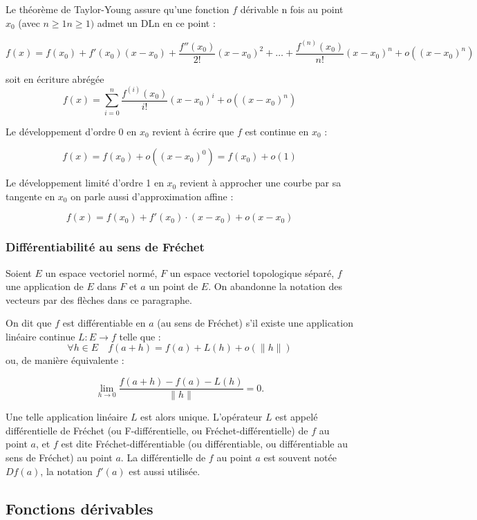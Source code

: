 		
			
		Le théorème de Taylor-Young assure \cite[voir dans][page:241]{coulombeau2013math} qu'une fonction $f$ dérivable n fois au point $x_0$ (avec ${\displaystyle n\geq 1}n\geq 1)$ admet un DLn en ce point :
		
		$$
			{\displaystyle f(x)=f(x_{0})+f'(x_{0})(x-x_{0})+{\frac {f''(x_{0})}{2!}}(x-x_{0})^{2}+\dots +{\frac {f^{(n)}(x_{0})}{n!}}(x-x_{0})^{n}+o((x-x_{0})^{n})}
		$$
		
		soit en écriture abrégée
		$$
			f(x)=\sum _{{i=0}}^{n}{\frac  {f^{{(i)}}(x_{0})}{i!}}(x-x_{0})^{i}+o((x-x_{0})^{n})
		$$
		
		Le développement d'ordre $0$ en $x_0$ revient à écrire que $f$ est continue en $x_0$ :
		
		$$
		{\displaystyle f(x)=f(x_{0})+o((x-x_{0})^{0})=f(x_{0})+o(1)}
		$$
		
		Le développement limité d'ordre 1 en $x_0$ revient à approcher une courbe par sa tangente en $x_0$ on parle aussi d'approximation affine :
		
		$$
		f(x)=f(x_{0})+f'(x_{0})\cdot (x-x_{0})+o(x-x_{0})
		$$
		
		\subsubsection{Différentiabilité au sens de Fréchet} \label{sec:drv_frechet}
			Soient $E$ un espace vectoriel normé, $F$ un espace vectoriel topologique séparé, $f$ une application de $E$ dans $F$ et $a$ un point de $E$. On abandonne la notation des vecteurs par des flèches dans ce paragraphe.
			
			On dit que $f$ est différentiable en $a$ (au sens de Fréchet) s'il existe une application linéaire continue ${\displaystyle L:E\to f}$ telle que :
			$$
			\forall h\in E\quad f(a+h)=f(a)+L(h)+o\left(\|h\|\right)
			$$
			ou, de manière équivalente :
			
			$$
			\lim _{h\to 0}{\frac {f(a+h)-f(a)-L(h)}{\|h\|}}=0.
			$$
			
			Une telle application linéaire $L$ est alors unique.
			L’opérateur $L$ est appelé différentielle de Fréchet (ou F-différentielle, ou Fréchet-différentielle) de $f$ au point $a$, et $f$ est dite Fréchet-différentiable (ou différentiable, ou différentiable au sens de Fréchet) au point $a$. La différentielle de $f$ au point $a$ est souvent notée $Df(a)$, la notation
			$f'(a)$ est aussi utilisée.
	\subsection{Fonctions dérivables}
		
